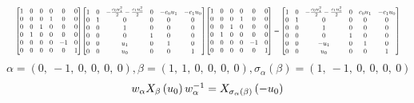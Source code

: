 \documentclass[11pt]{article}
\theoremstyle{definition}
\begin{document}
\[
\scaletoalign{\textwidth}{{\left[\begin{matrix}1 & 0 & 0 & 0 & 0 & 0\\0 & 0 & 0 & 1 & 0 & 0\\0 & 0 & 1 & 0 & 0 & 0\\0 & 1 & 0 & 0 & 0 & 0\\0 & 0 & 0 & 0 & -1 & 0\\0 & 0 & 0 & 0 & 0 & 1\end{matrix}\right]} {\left[\begin{matrix}1 & 0 & - \frac{c_{0} u_{1}^{2}}{2} - \frac{c_{1} u_{0}^{2}}{2} & 0 & - c_{0} u_{1} & - c_{1} u_{0}\\0 & 1 & 0 & 0 & 0 & 0\\0 & 0 & 1 & 0 & 0 & 0\\0 & 0 & 0 & 1 & 0 & 0\\0 & 0 & u_{1} & 0 & 1 & 0\\0 & 0 & u_{0} & 0 & 0 & 1\end{matrix}\right]} {\left[\begin{matrix}1 & 0 & 0 & 0 & 0 & 0\\0 & 0 & 0 & 1 & 0 & 0\\0 & 0 & 1 & 0 & 0 & 0\\0 & 1 & 0 & 0 & 0 & 0\\0 & 0 & 0 & 0 & -1 & 0\\0 & 0 & 0 & 0 & 0 & 1\end{matrix}\right]} = {\left[\begin{matrix}1 & 0 & - \frac{c_{0} u_{1}^{2}}{2} - \frac{c_{1} u_{0}^{2}}{2} & 0 & c_{0} u_{1} & - c_{1} u_{0}\\0 & 1 & 0 & 0 & 0 & 0\\0 & 0 & 1 & 0 & 0 & 0\\0 & 0 & 0 & 1 & 0 & 0\\0 & 0 & - u_{1} & 0 & 1 & 0\\0 & 0 & u_{0} & 0 & 0 & 1\end{matrix}\right]}}
\]
\[
\alpha = \left( 0, \  -1, \  0, \  0, \  0, \  0\right), \beta = \left( 1, \  1, \  0, \  0, \  0, \  0\right), \sigma_{\alpha}(\beta) = \left( 1, \  -1, \  0, \  0, \  0, \  0\right)
\]
\[
\scaletoalign{\textwidth}{w_{\alpha} X_{\beta}\left(u_{0}\right) w_{\alpha}^{-1} = X_{\sigma_{\alpha}\left(\beta\right)}\left(- u_{0}\right)}
\]
\end{document}
